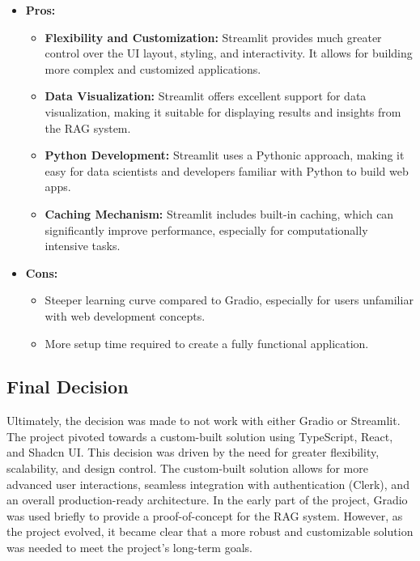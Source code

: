 \documentclass[12pt]{report}
\begin{document}
\begin{itemize}
    \item \textbf{Pros:}
        \begin{itemize}
            \item \textbf{Flexibility and Customization:} Streamlit provides much greater control over the UI layout, styling, and interactivity. It allows for building more complex and customized applications.
            \item \textbf{Data Visualization:} Streamlit offers excellent support for data visualization, making it suitable for displaying results and insights from the RAG system.
            \item \textbf{Python Development:} Streamlit uses a Pythonic approach, making it easy for data scientists and developers familiar with Python to build web apps.
            \item \textbf{Caching Mechanism:} Streamlit includes built-in caching, which can significantly improve performance, especially for computationally intensive tasks.
            
        \end{itemize}
    \item \textbf{Cons:}
        \begin{itemize}
            \item Steeper learning curve compared to Gradio, especially for users unfamiliar with web development concepts.
            \item More setup time required to create a fully functional application.
        \end{itemize}
\end{itemize}
\subsection{Final Decision}
Ultimately, the decision was made to not work with either Gradio or Streamlit. The project pivoted towards a custom-built solution using TypeScript, React, and Shadcn UI. This decision was driven by the need for greater flexibility, scalability, and design control. The custom-built solution allows for more advanced user interactions, seamless integration with authentication (Clerk), and an overall production-ready architecture. In the early part of the project, Gradio was used briefly to provide a proof-of-concept for the RAG system. However, as the project evolved, it became clear that a more robust and customizable solution was needed to meet the project's long-term goals.
\end{document}
